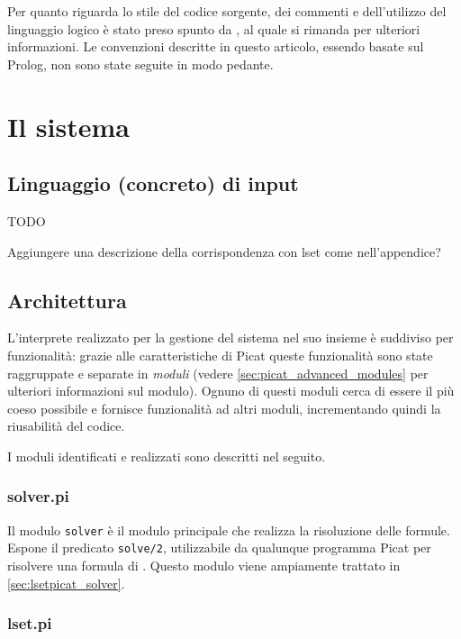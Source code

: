 \documentclass[12pt,a4paper,openright]{book} %
\begin{document}
Per quanto riguarda lo stile del codice sorgente, dei commenti e
dell'utilizzo del linguaggio logico è stato preso spunto da
\cite{Covington12}, al quale si rimanda per ulteriori informazioni. Le
convenzioni descritte in questo articolo, essendo basate sul Prolog,
non sono state seguite in modo pedante.

\section{Il sistema}
\label{sec:lsetpicat_system}

\subsection{Linguaggio (concreto) di input}

TODO

Aggiungere una descrizione della corrispondenza con lset come
nell'appendice?

\subsection{Architettura}
\label{sec:lsetpicat_architecture}

L'interprete realizzato per la gestione del sistema nel suo insieme è
suddiviso per funzionalità: grazie alle caratteristiche di Picat
queste funzionalità sono state raggruppate e separate in \emph{moduli}
(vedere \ref{sec:picat_advanced_modules} per ulteriori informazioni
sul modulo). Ognuno di questi moduli cerca di essere il più coeso
possibile e fornisce funzionalità ad altri moduli, incrementando
quindi la riusabilità del codice.

I moduli identificati e realizzati sono descritti nel seguito.

\subsubsection{solver.pi}

Il modulo \texttt{solver} è il modulo principale che realizza la
risoluzione delle formule. Espone il predicato \verb|solve/2|,
utilizzabile da qualunque programma Picat per risolvere una formula di
\lset{}. Questo modulo viene ampiamente trattato in
\ref{sec:lsetpicat_solver}.

\subsubsection{lset.pi}
\end{document}
